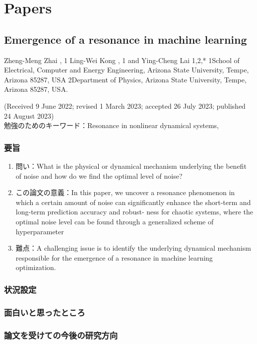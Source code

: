 \section{Papers}
\subsection{Emergence of a resonance in machine learning}
Zheng-Meng Zhai , 1 Ling-Wei Kong , 1 and Ying-Cheng Lai 1,2,*
1School of Electrical, Computer and Energy Engineering, Arizona State University, Tempe, Arizona 85287, USA
2Department of Physics, Arizona State University, Tempe, Arizona 85287, USA.

\noindent (Received 9 June 2022; revised 1 March 2023; accepted 26 July 2023; published 24 August 2023)
\\

\noindent 勉強のためのキーワード：Resonance in nonlinear dynamical systems, 

\subsubsection{要旨}
\begin{enumerate}
  \item 問い：What is the physical or dynamical mechanism underlying the beneﬁt of noise and
  how do we ﬁnd the optimal level of noise?
  \item この論文の意義：In this paper, we uncover a resonance phenomenon in
  which a certain amount of noise can signiﬁcantly enhance
  the short-term and long-term prediction accuracy and robust-
  ness for chaotic systems, where the optimal noise level can
  be found through a generalized scheme of hyperparameter
  \item 難点：A challenging issue is to identify the underlying dynamical mechanism responsible for the emergence of a resonance
  in machine learning optimization.
\end{enumerate}

\subsubsection{状況設定}

\subsubsection{面白いと思ったところ}

\subsubsection{論文を受けての今後の研究方向}
